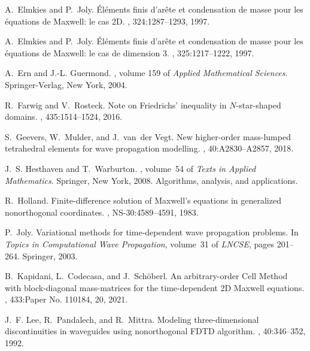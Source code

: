 \documentclass[12pt,reqno,a4paper]{amsart}
\theoremstyle{definition}
\begin{document}
\begin{thebibliography}{10}
A.~Elmkies and P.~Joly.
\newblock Éléments finis d'arête et condensation de masse pour les
  équations de {M}axwell: le cas {2D}.
, 324:1287--1293, 1997.

A.~Elmkies and P.~Joly.
\newblock Éléments finis d'arête et condensation de masse pour les
  équations de {M}axwell: le cas de dimension 3.
, 325:1217--1222, 1997.

A.~Ern and J.-L. Guermond.
, volume 159 of {\em
  Applied Mathematical Sciences}.
\newblock Springer-Verlag, New York, 2004.

R.~Farwig and V.~Rosteck.
\newblock Note on {F}riedrichs' inequality in {$N$}-star-shaped domains.
, 435:1514--1524, 2016.

S.~Geevers, W.~Mulder, and J.~van~der Vegt.
\newblock New higher-order mass-lumped tetrahedral elements for wave
  propagation modelling.
, 40:A2830--A2857, 2018.

J.~S. Hesthaven and T.~Warburton.
, volume~54 of {\em Texts
  in Applied Mathematics}.
\newblock Springer, New York, 2008.
\newblock Algorithms, analysis, and applications.

R.~Holland.
\newblock Finite-difference solution of {M}axwell's equations in generalized
  nonorthogonal coordinates.
, NS-30:4589--4591, 1983.

P.~Joly.
\newblock Variational methods for time-dependent wave propagation problems.
\newblock In {\em Topics in Computational Wave Propagation}, volume~31 of {\em
  LNCSE}, pages 201--264. Springer, 2003.

B.~Kapidani, L.~Codecasa, and J.~Sch\"{o}berl.
\newblock An arbitrary-order {C}ell {M}ethod with block-diagonal mass-matrices
  for the time-dependent 2{D} {M}axwell equations.
, 433:Paper No. 110184, 20, 2021.

J.~F. Lee, R.~Pandalech, and R.~Mittra.
\newblock Modeling three-dimensional discontinuities in waveguides using
  nonorthogonal {FDTD} algorithm.
, 40:346--352,
  1992.


\end{thebibliography}
\end{document}

